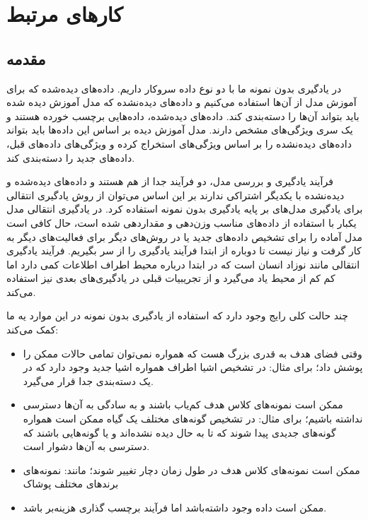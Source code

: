 \chapter{کارهای مرتبط}
\label{chap:three}
\section{مقدمه}

در یادگیری بدون نمونه ما با دو نوع داده سروکار داریم. داده‌های دیده‌شده که برای آموزش مدل از آن‌ها استفاده می‌کنیم و داده‌های دیده‌نشده که مدل آموزش دیده شده باید بتواند آن‌ها را دسته‌بندی کند. داده‌های دیده‌شده، داده‌هایی برچسب خورده هستند و یک سری ویژگی‌های مشخص دارند. مدل آموزش دیده بر اساس این داده‌ها باید بتواند داده‌های دیده‌نشده را بر اساس ویژگی‌های استخراج کرده و ویژگی‌های داده‌های قبل، داده‌های جدید را دسته‌بندی کند.

فرآیند یادگیری و بررسی مدل، دو فرآیند جدا از هم هستند و داده‌های دیده‌شده و دیده‌نشده با یکدیگر اشتراکی ندارند بر این اساس می‌توان از روش یادگیری انتقالی برای یادگیری مدل‌های بر پایه یادگیری بدون نمونه استفاده کرد. در یادگیری انتقالی مدل یکبار با استفاده از داده‌های مناسب وزن‌دهی و مقداردهی شده است،‌ حال کافی‌ است مدل آماده را برای تشخیص داده‌های جدید یا در روش‌های دیگر برای فعالیت‌های دیگر به کار گرفت و نیاز نیست تا دوباره از ابتدا فرآیند یادگیری را از سر بگیریم. فرآیند یادگیری انتقالی مانند نوزاد انسان است که در ابتدا درباره محیط اطراف اطلاعات کمی دارد اما کم کم از محیط یاد می‌گیرد و از تجریبیات قبلی در یادگیری‌های بعدی نیز استفاده می‌کند.

چند حالت کلی رایج وجود دارد که استفاده از یادگیری بدون نمونه در این موارد یه ما کمک می‌کند:
\begin{itemize}
	\item 
	وقتی فضای هدف به قدری بزرگ هست که همواره نمی‌توان تمامی حالات ممکن را پوشش داد؛ برای مثال: در تشخیص اشيا اطراف همواره اشیا جدید وجود دارد که در یک دسته‌بندی جدا قرار می‌گیرد.
	\item 
	ممکن است نمونه‌های کلاس هدف کم‌یاب باشند و به سادگی به آن‌ها دسترسی نداشته باشیم؛ برای مثال: در تشخیص گونه‌های مختلف یک گیاه ممکن است همواره گونه‌های جدیدی پیدا شوند که تا به حال دیده نشده‌اند و یا گونه‌هایی باشند که دسترسی به آن‌ها دشوار است.
	\item 
	ممکن است نمونه‌های کلاس هدف در طول زمان دچار تغییر شوند؛ مانند: نمونه‌های برند‌های مختلف پوشاک
	\item
	ممکن است داده وجود داشته‌باشد اما فرآیند برچسب گذاری هزینه‌بر باشد.
\end{itemize}

